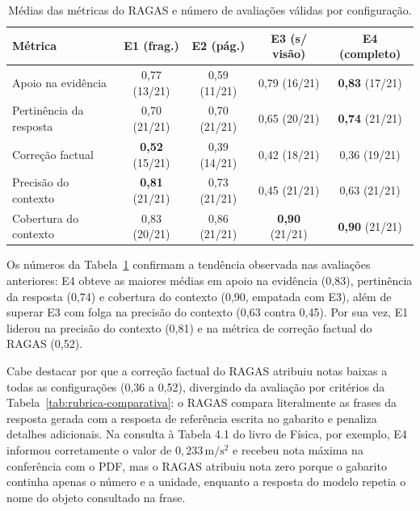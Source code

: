 \begin{table}[H]
    \centering
    \caption{Médias das métricas do RAGAS e número de avaliações válidas por configuração.}
    \label{tab:ragas-comparativo}
    {\ABNTEXfontereduzida
    \begin{tabular}{@{}lcccc@{}}
        \toprule
        \textbf{Métrica} & \textbf{E1 (frag.)} & \textbf{E2 (pág.)} & \textbf{E3 (s/ visão)} & \textbf{E4 (completo)} \\
        \midrule
        Apoio na evidência      & 0,77 (13/21) & 0,59 (11/21) & 0,79 (16/21) & \textbf{0,83} (17/21) \\
        Pertinência da resposta & 0,70 (21/21) & 0,70 (21/21) & 0,65 (20/21) & \textbf{0,74} (21/21) \\
        Correção factual        & \textbf{0,52} (15/21) & 0,39 (14/21) & 0,42 (18/21) & 0,36 (19/21) \\
        Precisão do contexto    & \textbf{0,81} (21/21) & 0,73 (21/21) & 0,45 (21/21) & 0,63 (21/21) \\
        Cobertura do contexto   & 0,83 (20/21) & 0,86 (21/21) & \textbf{0,90} (21/21) & \textbf{0,90} (21/21) \\
        \bottomrule
    \end{tabular}
    }
\end{table}

Os números da Tabela~\ref{tab:ragas-comparativo} confirmam a tendência observada nas avaliações anteriores: E4 obteve as maiores médias em apoio na evidência (0,83), pertinência da resposta (0,74) e cobertura do contexto (0,90, empatada com E3), além de superar E3 com folga na precisão do contexto (0,63 contra 0,45). Por sua vez, E1 liderou na precisão do contexto (0,81) e na métrica de correção factual do RAGAS (0,52).

Cabe destacar por que a correção factual do RAGAS atribuiu notas baixas a todas as configurações (0,36 a 0,52), divergindo da avaliação por critérios da Tabela~\ref{tab:rubrica-comparativa}: o RAGAS compara literalmente as frases da resposta gerada com a resposta de referência escrita no gabarito e penaliza detalhes adicionais. Na consulta à Tabela 4.1 do livro de Física, por exemplo, E4 informou corretamente o valor de \(0{,}233\,\mathrm{m/s^2}\) e recebeu nota máxima na conferência com o PDF, mas o RAGAS atribuiu nota zero porque o gabarito continha apenas o número e a unidade, enquanto a resposta do modelo repetia o nome do objeto consultado na frase.

